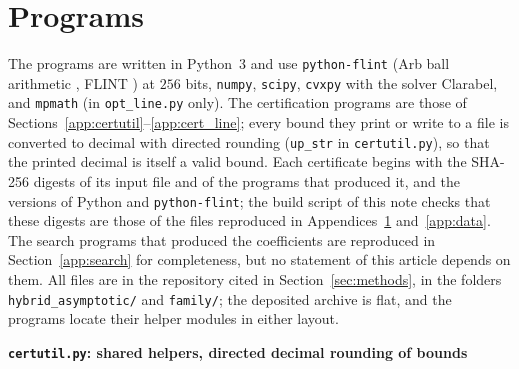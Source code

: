 \documentclass[11pt,reqno]{amsart}
\makeatletter
\let\CG@origcite\cite
\renewcommand*{\cite}[2][]{\def\CG@citekey{#2}%
  \ifx\relax#1\relax\CG@origcite{#2}\else\CG@origcite[#1]{#2}\fi}
\numberwithin{equation}{section}
\theoremstyle{definition}
\theoremstyle{remark}
\newcommand{\appsub}[1]{\par\medskip\noindent\textbf{#1}\par\nobreak\smallskip}
\makeatother
\begin{document}
\section{Programs}\label{app:code}
The programs are written in Python~3 and use \texttt{python-flint} (Arb ball arithmetic \cite{Johansson2017}, FLINT \cite{FLINT}) at $256$ bits, \texttt{numpy}, \texttt{scipy}, \texttt{cvxpy} with the solver Clarabel, and \texttt{mpmath} (in \texttt{opt\_line.py} only). The certification programs are those of Sections~\ref{app:certutil}--\ref{app:cert_line}; every bound they print or write to a file is converted to decimal with directed rounding (\texttt{up\_str} in \texttt{certutil.py}), so that the printed decimal is itself a valid bound. Each certificate begins with the SHA-256 digests of its input file and of the programs that produced it, and the versions of Python and \texttt{python-flint}; the build script of this note checks that these digests are those of the files reproduced in Appendices~\ref{app:code} and~\ref{app:data}. The search programs that produced the coefficients are reproduced in Section~\ref{app:search} for completeness, but no statement of this article depends on them. All files are in the repository cited in Section~\ref{sec:methods}, in the folders \texttt{hybrid\_asymptotic/} and \texttt{family/}; the deposited archive is flat, and the programs locate their helper modules in either layout.
\appsub{\texttt{certutil.py}: shared helpers, directed decimal rounding of bounds}
\label{app:certutil}
\end{document}
